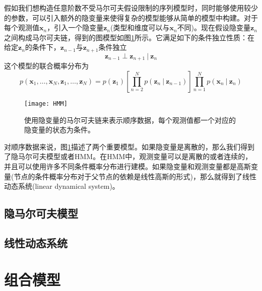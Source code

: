 \documentclass[11pt]{ctexbook}
\begin{document}
假如我们想构造任意阶数不受马尔可夫假设限制的序列模型时，同时能够使用较少的参数，可以引入额外的隐变量来使得复杂的模型能够从简单的模型中构建。对于每个观测值$\bm x_n$，引入一个隐变量$\bm z_n$(类型和维度可以与$\bm x_n$不同)。现在假设隐变量$\bm z_n$之间构成马尔可夫链，得到的图模型如图\ref{fig:HMM}所示。它满足如下的条件独立性质：在给定$\bm z_n$的条件下，$\bm z_{n-1}$与$\bm z_{n+1}$条件独立
\begin{equation}
	\bm z_{n-1} \perp \bm z_{n+1} \ |\ \bm z_n
\end{equation} 
这个模型的联合概率分布为
\begin{equation}
	p(\bm x_1, \ldots, \bm x_N, \bm z_1, \ldots, \bm z_N) = p(\bm z_1)\left [ \prod_{n=2}^{N}p(\bm z_n\ |\ \bm z_{n-1}) \right ]\prod_{n=1}^{N}p(\bm x_n\ |\ \bm z_n)
\end{equation}
\begin{figure}
	\centering
	\texttt{[image: HMM]}
	\caption{使用隐变量的马尔可夫链来表示顺序数据，每个观测值都一个对应的隐变量的状态为条件。}
	\label{fig:HMM}
\end{figure}

对顺序数据来说，图\ref{fig:HMM}描述了两个重要模型。如果隐变量是离散的，那么我们得到了隐马尔可夫模型或者HMM。在HMM中，观测变量可以是离散的或者连续的，并且可以使用许多不同条件概率分布进行建模。如果隐变量和观测变量都是高斯变量(节点的条件概率分布对于父节点的依赖是线性高斯的形式)，那么就得到了线性动态系统(linear dynamical system)。
\section{隐马尔可夫模型}



\section{线性动态系统}


\chapter{组合模型}
\end{document}
